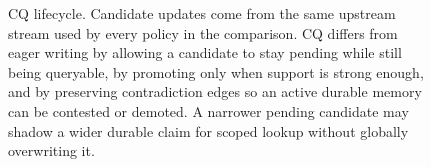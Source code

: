 \begin{figure}[H]
{%
}
\caption{CQ lifecycle. Candidate updates come from the same upstream stream
  used by every policy in the comparison. CQ differs from eager writing by
  allowing a candidate to stay pending while still being queryable, by
  promoting only when support is strong enough, and by preserving
  contradiction edges so an active durable memory can be contested or demoted.
  A narrower pending candidate may shadow a wider durable claim for scoped
  lookup without globally overwriting it.}
\label{fig:cq-lifecycle}
\end{figure}

